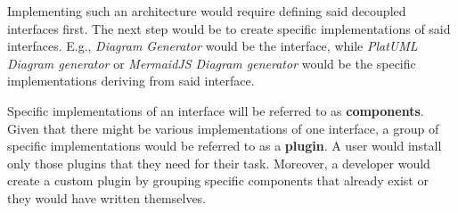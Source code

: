 Implementing such an architecture would require defining said decoupled interfaces first.
The next step would be to create specific implementations of said interfaces. E.g., \textit{Diagram Generator} would be the interface, while \textit{PlatUML Diagram generator} or \textit{MermaidJS Diagram generator} would be the specific implementations deriving from said interface.

Specific implementations of an interface will be referred to as \textbf{components}. Given that there might be various implementations of one interface, a group of specific implementations would be referred to as a \textbf{plugin}. A user would install only those plugins that they need for their task. Moreover, a developer would create a custom plugin by grouping specific components that already exist or they would have written themselves.

